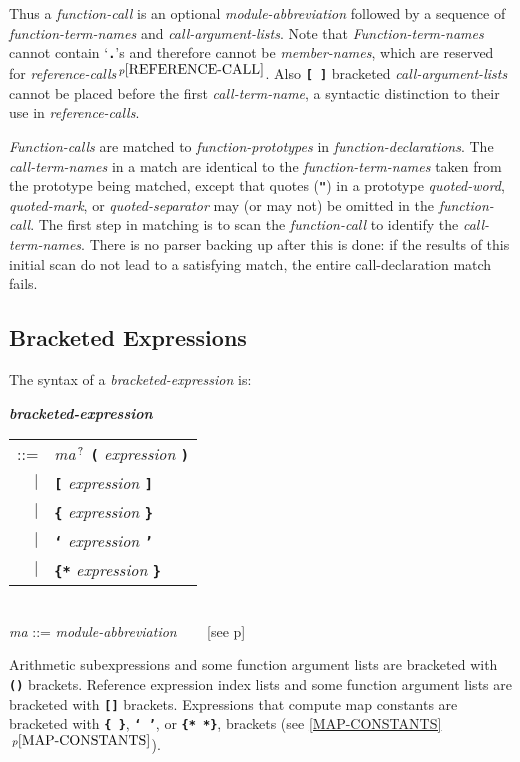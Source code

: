 \documentclass[12pt]{article}
\newcommand{\TT}[1]{{\tt \bfseries #1}}
\newcommand{\QMARK}{{$^{\,\mbox{\footnotesize ?}}$}}
\newcommand{\emkey}[1]{{\em \bfseries #1}}
\newcommand{\itemref}[1]{\ref{#1}$\,^{p\pageref{#1}}$}
\newcommand{\pagref}[1]{p\pageref{#1}}
\newcommand{\pagnote}[1]{$\,^{p\pageref{#1}}$}
\newenvironment{indpar}[1][0.3in]%
	{\begin{list}{}%
		     {\setlength{\itemsep}{0in}%
		      \setlength{\topsep}{0in}%
		      \setlength{\parsep}{1ex}%
		      \setlength{\labelwidth}{#1}%
		      \setlength{\leftmargin}{#1}%
		      \addtolength{\leftmargin}{\labelsep}}%
	 \item}%
	{\end{list}}
\begin{document}
Thus a {\em function-call} is an optional {\em module-abbreviation}
followed by a sequence of {\em function-term-names}
and {\em call-argument-lists}.  Note that {\em Function-term-names} cannot
contain `\TT{.}'s and therefore cannot be {\em member-names},
which are reserved for {\em reference-calls}\pagnote{REFERENCE-CALL}.
Also \TT{[~]} bracketed {\em call-argument-lists} cannot be placed
before the first {\em call-term-name}, a syntactic distinction to their
use in {\em reference-calls}.

{\em Function-calls} are matched to {\em function-prototypes} in
{\em function-declarations}.  The
{\em call-term-names} in a match are identical to the
{\em function-term-names} taken from the prototype being matched, except
that quotes (\TT{"}) in a prototype {\em quoted-word}, {\em quoted-mark}, or
{\em quoted-separator} may (or may not) be omitted in the
{\em function-call}.  The first
step in matching is to scan the {\em function-call} to identify the
{\em call-term-names}.  There is no parser backing up after this is
done: if the results of this initial scan do not lead to a satisfying
match, the entire call-declaration match fails.

\subsection{Bracketed Expressions}
\label{BRACKETED-EXPRESSIONS}

The syntax of a {\em bracketed-expression} is:

\begin{indpar}
\emkey{bracketed-expression}\label{BRACKETED-EXPRESSION}
    \begin{tabular}[t]{@{}rl}
    ::= & {\em ma}\QMARK{} \TT{(} {\em expression} \TT{)} \\
    $|$ & \TT{[} {\em expression} \TT{]} \\
    $|$ & \TT{\{} {\em expression} \TT{\}} \\
    $|$ & \TT{`} {\em expression} \TT{'} \\
    $|$ & \TT{\{*} {\em expression} \TT{*\}} \\
    \end{tabular}
\\[0.5ex]
{\em ma} ::= {\em module-abbreviation} ~~~ [see \pagref{MODULE-ABBREVIATION}]
\end{indpar}

Arithmetic subexpressions and some function argument lists are bracketed
with \TT{()} brackets.  Reference expression index lists and some function
argument lists are bracketed with \TT{[]} brackets.
Expressions that compute map constants
are bracketed with \TT{\{~\}}, \TT{`~'}, or \TT{\{*~*\}},
brackets (see \itemref{MAP-CONSTANTS}).
\end{document}
